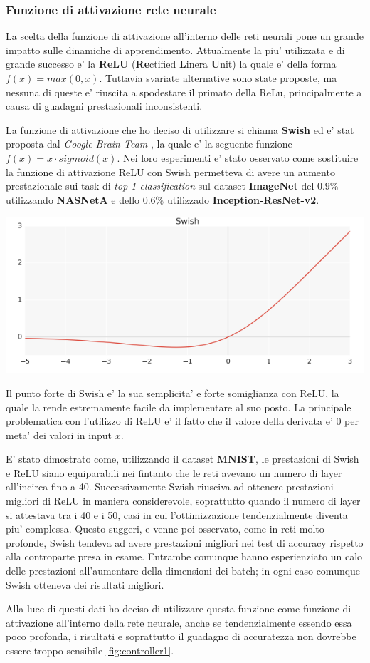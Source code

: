 \subsubsection*{Funzione di attivazione rete neurale}
La scelta della funzione di attivazione all'interno delle reti neurali pone un grande impatto sulle 
dinamiche di apprendimento. Attualmente la piu' utilizzata e di grande successo e' la \textbf{ReLU}
(\textbf{Re}ctified \textbf{L}inera \textbf{U}nit) la quale e' della forma $f(x) = max(0,x)$. Tuttavia svariate 
alternative sono state proposte, ma nessuna di queste e' riuscita a spodestare il primato della ReLu, principalmente 
a causa di guadagni prestazionali inconsistenti. 

La funzione di attivazione che ho deciso di utilizzare si chiama \textbf{Swish} ed e' stat proposta dal 
\emph{Google Brain Team} \cite{ramachandran2017searching}, la quale e' la seguente funzione $f(x) = x \cdot sigmoid(x)$. 
Nei loro esperimenti e' stato osservato come sostituire la funzione di attivazione ReLU con Swish permetteva 
di avere un aumento prestazionale sui task di \emph{top-1 classification} sul dataset \textbf{ImageNet} del $0.9\%$ utilizzando
\textbf{NASNetA} e dello $0.6\%$ utilizzado \textbf{Inception-ResNet-v2}. 

\begin{minipage}{\linewidth}
	\centering
	\includegraphics[width=\textwidth]{img/Screen-Shot-2017-10-18-at-2.39.55-PM.png}
	\label{fig:swish}
\end{minipage}

Il punto forte di Swish e' la sua semplicita' e forte somiglianza con ReLU, la quale la rende estremamente facile da implementare
al suo posto. La principale problematica con l'utilizzo di ReLU e' il fatto che il valore della derivata e' 0 per meta' 
dei valori in input $x$. 

E' stato dimostrato come, utilizzando il dataset \textbf{MNIST}, le prestazioni di Swish e ReLU siano 
equiparabili nei fintanto che le reti avevano un numero di layer all'incirca fino a 40. Successivamente Swish riusciva ad ottenere 
prestazioni migliori di ReLU in maniera considerevole, soprattutto quando il numero di layer si attestava tra i 40 e i 50, casi 
in cui l'ottimizzazione tendenzialmente diventa piu' complessa. Questo suggeri, e venne poi osservato, come 
in reti molto profonde, Swish tendeva ad avere prestazioni migliori nei test di accuracy rispetto alla controparte presa in esame. 
Entrambe comunque hanno esperienziato un calo delle prestazioni all'aumentare della dimensioni dei batch; in ogni caso comunque Swish otteneva 
dei risultati migliori. 

Alla luce di questi dati ho deciso di utilizzare questa funzione come funzione di attivazione all'interno della rete neurale, 
anche se tendenzialmente essendo essa poco profonda, i risultati e soprattutto il guadagno di accuratezza non dovrebbe essere troppo sensibile \ref{fig:controller1}.